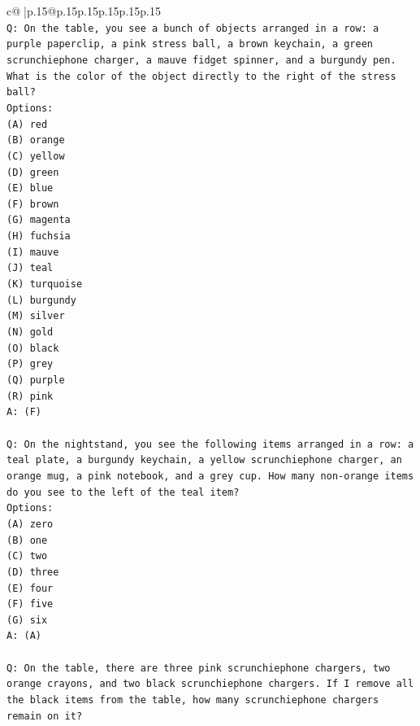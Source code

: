 \documentclass{article}
\begin{document}
{\begin{supertabular}{c@{$\;$}|p{.15\linewidth}@{}p{.15\linewidth}p{.15\linewidth}p{.15\linewidth}p{.15\linewidth}p{.15\linewidth}}
{{{\\ 
\texttt{Q: On the table, you see a bunch of objects arranged in a row: a purple paperclip, a pink stress ball, a brown keychain, a green scrunchiephone charger, a mauve fidget spinner, and a burgundy pen. What is the color of the object directly to the right of the stress ball?} \\
\texttt{Options:} \\
\texttt{(A) red} \\
\texttt{(B) orange} \\
\texttt{(C) yellow} \\
\texttt{(D) green} \\
\texttt{(E) blue} \\
\texttt{(F) brown} \\
\texttt{(G) magenta} \\
\texttt{(H) fuchsia} \\
\texttt{(I) mauve} \\
\texttt{(J) teal} \\
\texttt{(K) turquoise} \\
\texttt{(L) burgundy} \\
\texttt{(M) silver} \\
\texttt{(N) gold} \\
\texttt{(O) black} \\
\texttt{(P) grey} \\
\texttt{(Q) purple} \\
\texttt{(R) pink} \\
\texttt{A: (F)} \\
\\ 
\texttt{Q: On the nightstand, you see the following items arranged in a row: a teal plate, a burgundy keychain, a yellow scrunchiephone charger, an orange mug, a pink notebook, and a grey cup. How many non{-}orange items do you see to the left of the teal item?} \\
\texttt{Options:} \\
\texttt{(A) zero} \\
\texttt{(B) one} \\
\texttt{(C) two} \\
\texttt{(D) three} \\
\texttt{(E) four} \\
\texttt{(F) five} \\
\texttt{(G) six} \\
\texttt{A: (A)} \\
\\ 
\texttt{Q: On the table, there are three pink scrunchiephone chargers, two orange crayons, and two black scrunchiephone chargers. If I remove all the black items from the table, how many scrunchiephone chargers remain on it?} \\
}}}
\end{supertabular}}
\end{document}
